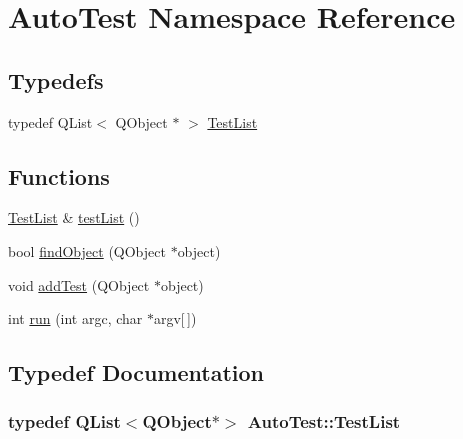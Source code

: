 \hypertarget{namespaceAutoTest}{\section{Auto\-Test Namespace Reference}
\label{namespaceAutoTest}
}
\subsection*{Typedefs}
\begin{DoxyCompactItemize}
\item 
typedef Q\-List$<$ Q\-Object $\ast$ $>$ \hyperlink{namespaceAutoTest_af30e241e62927ef8b429177cea542f2f}{Test\-List}
\end{DoxyCompactItemize}
\subsection*{Functions}
\begin{DoxyCompactItemize}
\item 
\hyperlink{namespaceAutoTest_af30e241e62927ef8b429177cea542f2f}{Test\-List} \& \hyperlink{namespaceAutoTest_ad402cc96e71645ac9d583473f7ddbcd7}{test\-List} ()
\item 
bool \hyperlink{namespaceAutoTest_aebe87b1ec91a09f1b2739cbd4b301345}{find\-Object} (Q\-Object $\ast$object)
\item 
void \hyperlink{namespaceAutoTest_a3d2e7034d932dff0c2ba4170c442f594}{add\-Test} (Q\-Object $\ast$object)
\item 
int \hyperlink{namespaceAutoTest_a3261ec6bff9391a6f6779f63f6663b4b}{run} (int argc, char $\ast$argv\mbox{[}$\,$\mbox{]})
\end{DoxyCompactItemize}


\subsection{Typedef Documentation}
\hypertarget{namespaceAutoTest_af30e241e62927ef8b429177cea542f2f}{
\subsubsection[{Test\-List}]{\setlength{\rightskip}{0pt plus 5cm}typedef Q\-List$<$Q\-Object$\ast$$>$ {\bf Auto\-Test\-::\-Test\-List}}}\label{namespaceAutoTest_af30e241e62927ef8b429177cea542f2f}


